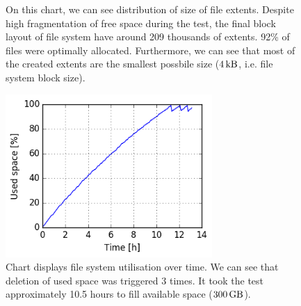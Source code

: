 \documentclass[
  color, %
  table, %
  lof,   %
  lot,   %
]{fithesis3}
\begin{document}
\begin{figure}[h]
    \centering
    \caption[Size distribution of file extents of ext4 during testing of high utilisation of HDD]{On this chart, we can see distribution of size of file extents. Despite high fragmentation of free space during the test, the final block layout of file system have around 209 thousands of extents. 92\% of files were optimally allocated. Furthermore, we can see that most of the created extents are the smallest possbile size ($\SI{4}{\kilo\byte}$, i.e. file system block size).}
    \label{fig:used99_ext4}
\end{figure}

\begin{figure}[!h]
    \begin{minipage}{\textwidth}
        \centering
        \includegraphics[width=0.7\textwidth]{../charts/HDD_ext4/usage.png}
        \caption[Usage of available space of ext4 during testing of high utilisation of HDD]{Chart displays file system utilisation over time. We can see that deletion of used space was triggered 3 times. It took the test approximately 10.5 hours to fill available space ($\SI{300}{\giga\byte}$).}
\label{fig:usage99_ext4}
    \end{minipage}
\end{figure}
\end{document}
